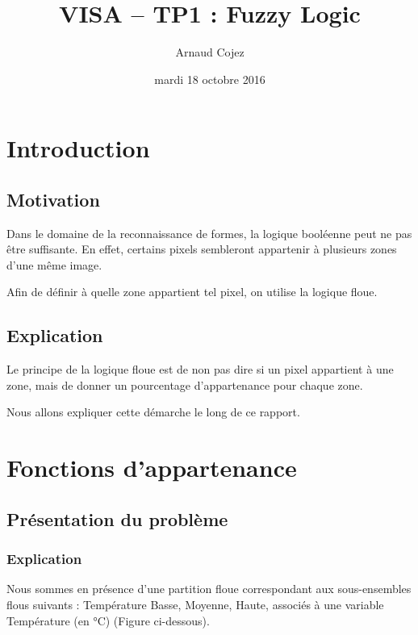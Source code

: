 \documentclass[a4paper]{article}
\begin{document}
\title{VISA -- TP1 : Fuzzy Logic}
\author{Arnaud Cojez}
\date{mardi 18 octobre 2016}

\maketitle

\newpage
\tableofcontents
\newpage

\section{Introduction}

\subsection{Motivation}
Dans le domaine de la reconnaissance de formes, la logique booléenne peut ne pas être suffisante. En effet, certains pixels sembleront appartenir à plusieurs zones d'une même image.

Afin de définir à quelle zone appartient tel pixel, on utilise la logique floue.

\subsection{Explication}
Le principe de la logique floue est de non pas dire si un pixel appartient à une zone, mais de donner un pourcentage d'appartenance pour chaque zone.

Nous allons expliquer cette démarche le long de ce rapport.

\clearpage

\section{Fonctions d'appartenance}

\subsection{Présentation du problème}

\subsubsection{Explication}
Nous sommes en présence d'une partition floue correspondant aux sous-ensembles flous suivants : Température Basse, Moyenne, Haute, associés à une variable Température (en °C) (Figure ci-dessous).
\end{document}

